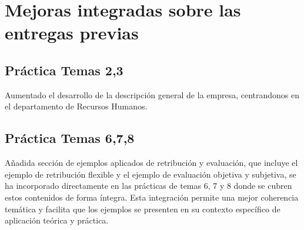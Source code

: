 
\chapter{Mejoras integradas sobre las entregas previas}

\section{Práctica Temas 2,3}
\begin{bloquedemejora}
Aumentado el desarrollo de la descripción general de la empresa, centrandonos en el departamento de Recursos Humanos.
\end{bloquedemejora}

\section{Práctica Temas 6,7,8}

\begin{bloquedemejora}
Añadida sección de ejemplos aplicados de retribución y evaluación, que incluye
el ejemplo de retribución flexible y el ejemplo de evaluación objetiva y subjetiva,
se ha incorporado directamente en las prácticas de temas 6, 7 y 8 donde se cubren
estos contenidos de forma íntegra. Esta integración permite una mejor coherencia
temática y facilita que los ejemplos se presenten en su contexto específico de
aplicación teórica y práctica.
\end{bloquedemejora}

\endinput
